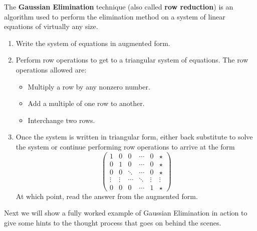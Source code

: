 \begin{definition}
    The {\bf Gaussian Elimination} technique (also called {\bf row reduction}) is an
    algorithm used to perform the elimination method on a system of linear equations of
    virtually any size.
    \begin{enumerate}
        \item Write the system of equations in augmented form.
        \item Perform row operations to get to a triangular system of equations.  The row
            operations allowed are:
            \begin{itemize}
                \item Multiply a row by any nonzero number.
                \item Add a multiple of one row to another.
                \item Interchange two rows.
            \end{itemize}
        \item Once the system is written in triangular form, either back substitute to solve the
            system or continue performing row operations to arrive at the form
            \[ \left( \begin{array}{ccccc|c} 1 & 0 & 0 & \cdots & 0 & \star \\
                    0 & 1 & 0 & \cdots & 0 & \star \\
                    0 & 0 & \ddots & \cdots & 0 & \star \\
                    \vdots & \vdots & \cdots & \ddots & \vdots & \vdots \\
                    0 & 0 & 0 & \cdots & 1 & \star \end{array} \right) \]
            At which point, read the answer from the augmented form.
    \end{enumerate}
\end{definition}

Next we will show a fully worked example of Gaussian Elimination in action to give some
hints to the thought process that goes on behind the scenes.  


